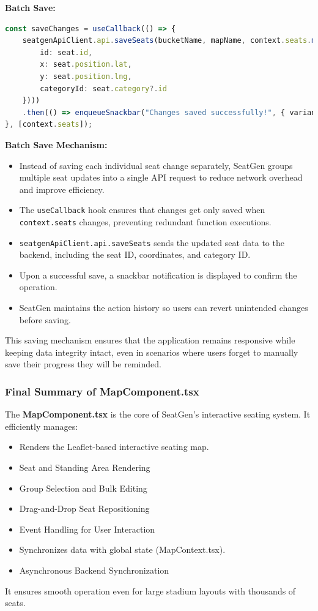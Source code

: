 \textbf{Batch Save:}
\begin{lstlisting}[language=TypeScript, caption=Batch Save Mechanism, label=lst:batch-save-seats]
const saveChanges = useCallback(() => {
    seatgenApiClient.api.saveSeats(bucketName, mapName, context.seats.map(seat => ({
        id: seat.id,
        x: seat.position.lat,
        y: seat.position.lng,
        categoryId: seat.category?.id
    })))
    .then(() => enqueueSnackbar("Changes saved successfully!", { variant: "success" }));
}, [context.seats]);
\end{lstlisting}

\textbf{Batch Save Mechanism:}
\begin{itemize}
    \item Instead of saving each individual seat change separately, SeatGen groups multiple seat updates into a single API request to reduce network overhead and improve efficiency.
    \item The \texttt{useCallback} hook ensures that changes get only saved when \texttt{context.seats} changes, preventing redundant function executions.
    \item \texttt{seatgenApiClient.api.saveSeats} sends the updated seat data to the backend, including the seat ID, coordinates, and category ID.
    \item Upon a successful save, a snackbar notification is displayed to confirm the operation.
    \item SeatGen maintains the action history so users can revert unintended changes before saving.
\end{itemize}

This saving mechanism ensures that the application remains responsive while keeping data integrity intact, even in scenarios where users forget to manually save their progress they will be reminded.

\subsubsection{Final Summary of MapComponent.tsx}
The \textbf{MapComponent.tsx} is the core of SeatGen’s interactive seating system. It efficiently manages:
\begin{itemize}
    \item Renders the Leaflet-based interactive seating map.
    \item Seat and Standing Area Rendering
    \item Group Selection and Bulk Editing
    \item Drag-and-Drop Seat Repositioning
    \item Event Handling for User Interaction
    \item Synchronizes data with global state (MapContext.tsx).
    \item Asynchronous Backend Synchronization
\end{itemize}

It ensures smooth operation even for large stadium layouts with thousands of seats.

